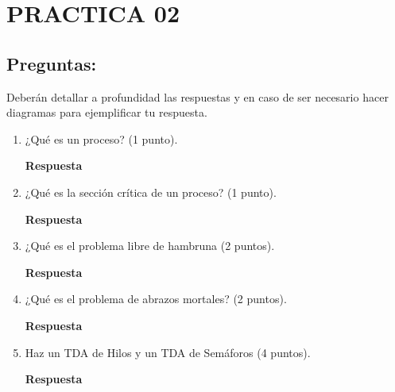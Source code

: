 \documentclass[12pt]{article}
\begin{document}

{\color{red} \section*{\textbf{PRACTICA 02}}}
\vspace{1em}

{\color{blue} \subsection*{\textbf{Preguntas:}}}


Deberán detallar a profundidad las respuestas y en caso de ser necesario hacer diagramas 
para ejemplificar tu respuesta.\\


\begin{enumerate}
    \item ¿Qué es un proceso? (1 punto).
    \vspace{2mm}
    
    \textbf{Respuesta}
    \item ¿Qué es la sección crítica de un  proceso? (1 punto).
    \vspace{2mm}
    
    \textbf{Respuesta}
    \item ¿Qué es el problema libre de hambruna (2 puntos).
    \vspace{2mm}
    
    \textbf{Respuesta}
    \item ¿Qué es el problema de abrazos mortales? (2 puntos).
    \vspace{2mm}
    
    \textbf{Respuesta}
    \item Haz un TDA de Hilos y  un TDA de Semáforos (4 puntos).
    \vspace{2mm}
    
    \textbf{Respuesta}
\end{enumerate}
\end{document}
